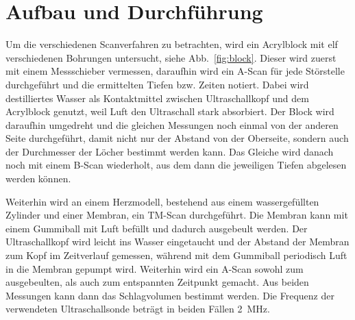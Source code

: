 \section {Aufbau und Durchführung}
\label{sec:durchführung}

Um die verschiedenen Scanverfahren zu betrachten, wird ein Acrylblock mit elf verschiedenen Bohrungen untersucht, siehe Abb.~\ref{fig:block}. Dieser wird zuerst mit einem Messschieber vermessen, daraufhin wird ein A-Scan für jede Störstelle durchgeführt und die ermittelten Tiefen bzw. Zeiten notiert. Dabei wird destilliertes Wasser als Kontaktmittel zwischen Ultraschallkopf und dem Acrylblock genutzt, weil Luft den Ultraschall stark absorbiert. Der Block wird daraufhin umgedreht und die gleichen Messungen noch einmal von der anderen Seite durchgeführt, damit nicht nur der Abstand von der Oberseite, sondern auch der Durchmesser der Löcher bestimmt werden kann. Das Gleiche wird danach noch mit einem B-Scan wiederholt, aus dem dann die jeweiligen Tiefen abgelesen werden können.

Weiterhin wird an einem Herzmodell, bestehend aus einem wassergefüllten Zylinder und einer Membran, ein TM-Scan durchgeführt. Die Membran kann mit einem Gummiball mit Luft befüllt und dadurch ausgebeult werden. Der Ultraschallkopf wird leicht ins Wasser eingetaucht und der Abstand der Membran zum Kopf im Zeitverlauf gemessen, während mit dem Gummiball periodisch Luft in die Membran gepumpt wird. Weiterhin wird ein A-Scan sowohl zum ausgebeulten, als auch zum entspannten Zeitpunkt gemacht. Aus beiden Messungen kann dann das Schlagvolumen bestimmt werden.
Die Frequenz der verwendeten Ultraschallsonde beträgt in beiden Fällen \SI{2}{\mega\hertz}.
